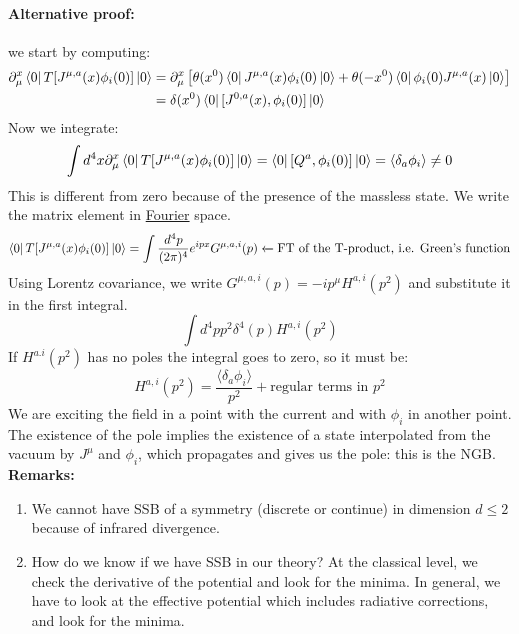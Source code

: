 \documentclass[../main.tex]{subfiles}
\begin{document}
\paragraph{Alternative proof:}
we start by computing:
\begin{align*}
\partial_\mu^x\bra{0}T[J^{\mu,a}(x)\phi_i(0)]\ket{0}&=\partial_\mu^x\left[\theta(x^0)\bra{0}J^{\mu,a}(x)\phi_i(0)\ket{0}+\theta(-x^0)\bra{0}\phi_i(0)J^{\mu,a}(x)\ket{0}\right]\\
&=\delta(x^0)\bra{0}[J^{0,a}(x),\phi_i(0)]\ket{0}
\end{align*}
Now we integrate:
\[
\int d^4x\partial_\mu^x\bra{0}T[J^{\mu,a}(x)\phi_i(0)]\ket{0}=\bra{0}[Q^a,\phi_i(0)]\ket{0}=\langle\delta_a\phi_i\rangle\neq0
\]
This is different from zero because of the presence of the massless state. We write the matrix element in \href{https://en.wikipedia.org/wiki/Joseph_Fourier}{Fourier} space.
\[
\bra{0}T[J^{\mu,a}(x)\phi_i(0)]\ket{0}=\int\frac{d^4p}{(2\pi)^4}e^{ipx}G^{\mu,a,i}(p)\xleftarrow[]{}\text{FT of the T-product, i.e. Green's function}
\]
Using Lorentz covariance, we write $G^{\mu,a,i}(p)=-ip^\mu H^{a,i}(p^2)$ and substitute it in the first integral.
\[
\int d^4pp^2\delta^4(p)H^{a,i}(p^2)
\]
If $H^{a.i}(p^2)$ has no poles the integral goes to zero, so it must be:
\[
H^{a,i}(p^2)=\frac{\langle\delta_a\phi_i\rangle}{p^2}+\text{regular terms in $p^2$}
\]
We are exciting the field in a point with the current and with $\phi_i$ in another point. The existence of the pole implies the existence of a state interpolated from the vacuum by $J^\mu$ and $\phi_i$, which propagates and gives us the pole: this is the NGB.\\

\textbf{Remarks:}
\begin{enumerate}
    \item We cannot have SSB of a symmetry (discrete or continue) in dimension $d\le2$ because of infrared divergence.
    \item How do we know if we have SSB in our theory? At the classical level, we check the derivative of the potential and look for the minima. In general, we have to look at the effective potential which includes radiative corrections, and look for the minima.
\end{enumerate}
\end{document}
